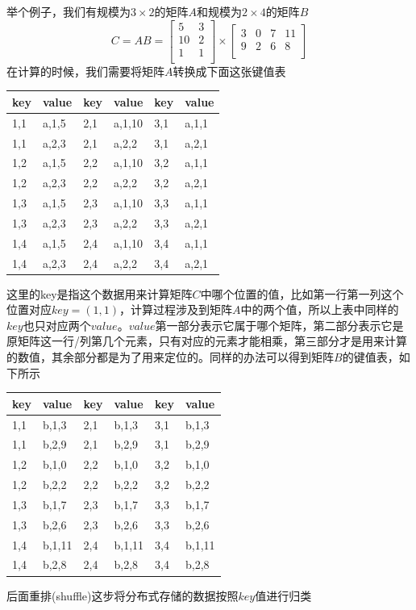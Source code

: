 \documentclass[a4paper, 14pt, twocolumn]{article}
\theoremstyle{definition}
\begin{document}
举个例子，我们有规模为$3\times2$的矩阵$A$和规模为$2\times4$的矩阵$B$
\[C=AB=
\begin{bmatrix}
5 & 3 \\
10 & 2\\
1 & 1\\
\end{bmatrix} \times
\begin{bmatrix}
3 & 0 & 7 & 11\\
9 & 2 & 6 & 8\\
\end{bmatrix}
\]
在计算的时候，我们需要将矩阵$A$转换成下面这张键值表

\begin{tabular}{|l|l||l|l||l|l|}
\hline
key & value & key & value & key & value\\
\hline
1,1 & a,1,5 & 2,1 & a,1,10 & 3,1 & a,1,1\\
\hline
1,1 & a,2,3 & 2,1 & a,2,2 & 3,1 & a,2,1\\
\hline
1,2 & a,1,5 & 2,2 & a,1,10 & 3,2 & a,1,1\\
\hline
1,2 & a,2,3 & 2,2 & a,2,2 & 3,2 & a,2,1\\
\hline
1,3 & a,1,5 & 2,3 & a,1,10 & 3,3 & a,1,1\\
\hline
1,3 & a,2,3 & 2,3 & a,2,2 & 3,3 & a,2,1\\
\hline
1,4 & a,1,5 & 2,4 & a,1,10 & 3,4 & a,1,1\\
\hline
1,4 & a,2,3 & 2,4 & a,2,2 & 3,4 & a,2,1\\
\hline
\end{tabular}

这里的key是指这个数据用来计算矩阵$C$中哪个位置的值，比如第一行第一列这个位置对应$key=(1,1)$，计算过程涉及到矩阵$A$中的两个值，所以上表中同样的$key$也只对应两个$value$。$value$第一部分表示它属于哪个矩阵，第二部分表示它是原矩阵这一行/列第几个元素，只有对应的元素才能相乘，第三部分才是用来计算的数值，其余部分都是为了用来定位的。同样的办法可以得到矩阵$B$的键值表，如下所示

\begin{tabular}{|l|l||l|l||l|l|}
\hline
key & value & key & value & key & value\\
\hline
1,1 & b,1,3 & 2,1 & b,1,3 & 3,1 & b,1,3\\
\hline
1,1 & b,2,9 & 2,1 & b,2,9 & 3,1 & b,2,9\\
\hline
1,2 & b,1,0 & 2,2 & b,1,0 & 3,2 & b,1,0\\
\hline
1,2 & b,2,2 & 2,2 & b,2,2 & 3,2 & b,2,2\\
\hline
1,3 & b,1,7 & 2,3 & b,1,7 & 3,3 & b,1,7\\
\hline
1,3 & b,2,6 & 2,3 & b,2,6 & 3,3 & b,2,6\\
\hline
1,4 & b,1,11 & 2,4 & b,1,11 & 3,4 & b,1,11\\
\hline
1,4 & b,2,8 & 2,4 & b,2,8 & 3,4 & b,2,8\\
\hline
\end{tabular}
后面重排(shuffle)这步将分布式存储的数据按照$key$值进行归类
\end{document}
